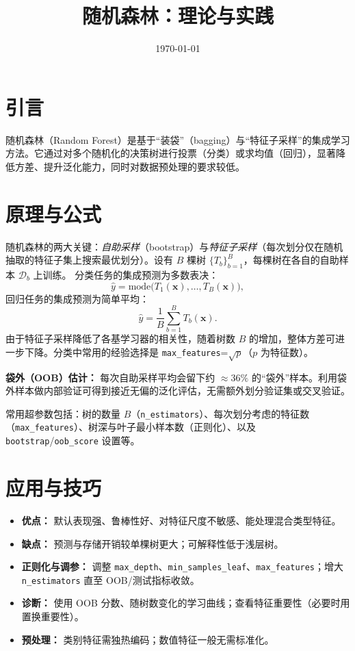 \documentclass[UTF8,zihao=-4]{ctexart}
\title{随机森林：理论与实践}
\author{}
\date{\today}
\begin{document}
\maketitle


\section{引言}
随机森林（Random Forest）是基于“装袋”（bagging）与“特征子采样”的集成学习方法。它通过对多个随机化的决策树进行投票（分类）或求均值（回归），显著降低方差、提升泛化能力，同时对数据预处理的要求较低。

\section{原理与公式}
随机森林的两大关键：\emph{自助采样}（bootstrap）与\emph{特征子采样}（每次划分仅在随机抽取的特征子集上搜索最优划分）。设有 $B$ 棵树 $\{T_b\}_{b=1}^B$，每棵树在各自的自助样本 $\mathcal{D}_b$ 上训练。
分类任务的集成预测为多数表决：
\begin{equation}
\hat{y} = \mathrm{mode}\big( T_1(\mathbf{x}),\dots,T_B(\mathbf{x}) \big),
\end{equation}
回归任务的集成预测为简单平均：
\begin{equation}
\hat{y} = \frac{1}{B} \sum_{b=1}^B T_b(\mathbf{x}).
\end{equation}
由于特征子采样降低了各基学习器的相关性，随着树数 $B$ 的增加，整体方差可进一步下降。分类中常用的经验选择是 \texttt{max\_features}=$\sqrt{p}$（$p$ 为特征数）。

\textbf{袋外（OOB）估计：} 每次自助采样平均会留下约 $\approx 36\%$ 的“袋外”样本。利用袋外样本做内部验证可得到接近无偏的泛化评估，无需额外划分验证集或交叉验证。

常用超参数包括：树的数量 $B$（\texttt{n\_estimators}）、每次划分考虑的特征数（\texttt{max\_features}）、树深与叶子最小样本数（正则化）、以及 \texttt{bootstrap}/\texttt{oob\_score} 设置等。

\section{应用与技巧}
\begin{itemize}
  \item \textbf{优点：} 默认表现强、鲁棒性好、对特征尺度不敏感、能处理混合类型特征。
  \item \textbf{缺点：} 预测与存储开销较单棵树更大；可解释性低于浅层树。
  \item \textbf{正则化与调参：} 调整 \texttt{max\_depth}、\texttt{min\_samples\_leaf}、\texttt{max\_features}；增大 \texttt{n\_estimators} 直至 OOB/测试指标收敛。
  \item \textbf{诊断：} 使用 OOB 分数、随树数变化的学习曲线；查看特征重要性（必要时用置换重要性）。
  \item \textbf{预处理：} 类别特征需独热编码；数值特征一般无需标准化。
\end{itemize}
\end{document}

